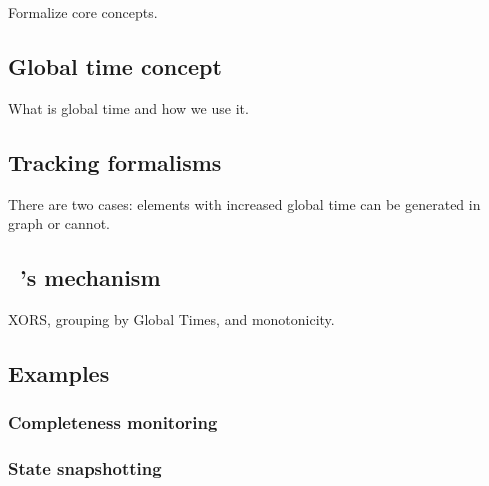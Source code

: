 \label {fs-acker-design}

Formalize core concepts.

\subsection{Global time concept}
What is global time and how we use it.

\subsection{Tracking formalisms}
There are two cases: elements with increased global time can be generated in graph or cannot.

\subsection{\tracker\ 's mechanism}
XORS, grouping by Global Times, and monotonicity. 

\subsection{Examples}

\subsubsection{Completeness monitoring}

\subsubsection{State snapshotting}




